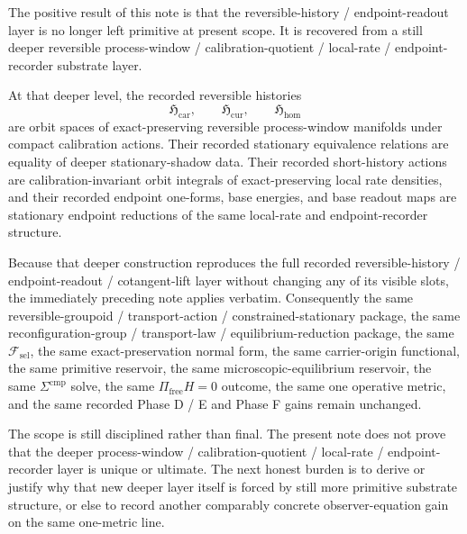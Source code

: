 \documentclass[11pt]{article}
\newcommand{\StemFunctional}{\mathscr F_{\mathrm{sel}}}
\newcommand{\TensorHistoryClass}{\mathfrak H_{\mathrm{car}}}
\newcommand{\CurHistoryClass}{\mathfrak H_{\mathrm{cur}}}
\newcommand{\HomHistoryClass}{\mathfrak H_{\mathrm{hom}}}
\begin{document}
The positive result of this note is that the reversible-history / endpoint-readout layer is no longer left primitive at present scope. It is recovered from a still deeper reversible process-window / calibration-quotient / local-rate / endpoint-recorder substrate layer.

At that deeper level, the recorded reversible histories
\[
\TensorHistoryClass,\qquad
\CurHistoryClass,\qquad
\HomHistoryClass
\]
are orbit spaces of exact-preserving reversible process-window manifolds under compact calibration actions. Their recorded stationary equivalence relations are equality of deeper stationary-shadow data. Their recorded short-history actions are calibration-invariant orbit integrals of exact-preserving local rate densities, and their recorded endpoint one-forms, base energies, and base readout maps are stationary endpoint reductions of the same local-rate and endpoint-recorder structure.

Because that deeper construction reproduces the full recorded reversible-history / endpoint-readout / cotangent-lift layer without changing any of its visible slots, the immediately preceding note applies verbatim. Consequently the same reversible-groupoid / transport-action / constrained-stationary package, the same reconfiguration-group / transport-law / equilibrium-reduction package, the same \(\StemFunctional\), the same exact-preservation normal form, the same carrier-origin functional, the same primitive reservoir, the same microscopic-equilibrium reservoir, the same \(\Sigma^{\mathrm{cmp}}\) solve, the same \(\Pi_{\mathrm{free}}H=0\) outcome, the same one operative metric, and the same recorded Phase D / E and Phase F gains remain unchanged.

The scope is still disciplined rather than final. The present note does not prove that the deeper process-window / calibration-quotient / local-rate / endpoint-recorder layer is unique or ultimate. The next honest burden is to derive or justify why that new deeper layer itself is forced by still more primitive substrate structure, or else to record another comparably concrete observer-equation gain on the same one-metric line.
\end{document}
